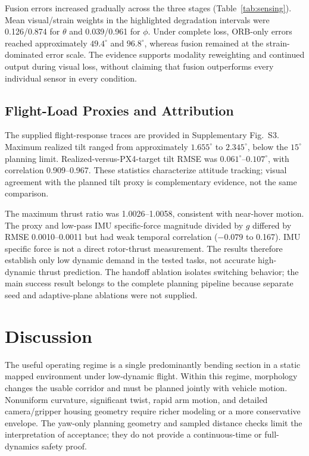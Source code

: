 \documentclass[journal,twoside]{IEEEtran}
\begin{document}
Fusion errors increased gradually across the three stages (Table~\ref{tab:sensing}). Mean visual/strain weights in the highlighted degradation intervals were 0.126/0.874 for $\theta$ and 0.039/0.961 for $\phi$. Under complete loss, ORB-only errors reached approximately $49.4^\circ$ and $96.8^\circ$, whereas fusion remained at the strain-dominated error scale. The evidence supports modality reweighting and continued output during visual loss, without claiming that fusion outperforms every individual sensor in every condition.

\subsection{Flight-Load Proxies and Attribution}
The supplied flight-response traces are provided in Supplementary Fig.~S3. Maximum realized tilt ranged from approximately $1.655^\circ$ to $2.345^\circ$, below the $15^\circ$ planning limit. Realized-versus-PX4-target tilt RMSE was $0.061^\circ$--$0.107^\circ$, with correlation 0.909--0.967. These statistics characterize attitude tracking; visual agreement with the planned tilt proxy is complementary evidence, not the same comparison.

The maximum thrust ratio was 1.0026--1.0058, consistent with near-hover motion. The proxy and low-pass IMU specific-force magnitude divided by $g$ differed by RMSE 0.0010--0.0011 but had weak temporal correlation ($-0.079$ to 0.167). IMU specific force is not a direct rotor-thrust measurement. The results therefore establish only low dynamic demand in the tested tasks, not accurate high-dynamic thrust prediction. The handoff ablation isolates switching behavior; the main success result belongs to the complete planning pipeline because separate seed and adaptive-plane ablations were not supplied.

\FloatBarrier
\section{Discussion}\label{sec:discussion}
The useful operating regime is a single predominantly bending section in a static mapped environment under low-dynamic flight. Within this regime, morphology changes the usable corridor and must be planned jointly with vehicle motion. Nonuniform curvature, significant twist, rapid arm motion, and detailed camera/gripper housing geometry require richer modeling or a more conservative envelope. The yaw-only planning geometry and sampled distance checks limit the interpretation of acceptance; they do not provide a continuous-time or full-dynamics safety proof.
\end{document}
